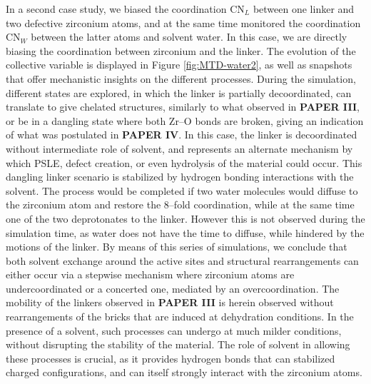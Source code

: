 In a second case study, we biased the coordination CN$_L$ between one linker and two defective zirconium atoms, and at the same time monitored the coordination CN$_W$ between the latter atoms and solvent water. In this case, we are directly biasing the coordination between zirconium and the linker. The evolution of the collective variable is displayed in Figure \ref{fig:MTD-water2}, as well as snapshots that offer mechanistic insights on the different processes. During the simulation, different states are explored, in which the linker is partially decoordinated, can translate to give chelated structures, similarly to what observed in \textbf{PAPER III}, or be in a dangling state where both Zr--O bonds are broken, giving an indication of what was postulated in \textbf{PAPER IV}. In this case, the linker is decoordinated without intermediate role of solvent, and represents an alternate mechanism by which PSLE, defect creation, or even hydrolysis of the material could occur. This dangling linker scenario is stabilized by hydrogen bonding interactions with the solvent. The process would be completed if two water molecules would diffuse to the zirconium atom and restore the 8--fold coordination, while at the same time one of the two deprotonates to the linker. However this is not observed during the simulation time, as water does not have the time to diffuse, while hindered by the motions of the linker.
\npar
By means of this series of simulations, we conclude that both solvent exchange around the active sites and structural rearrangements can either occur via a stepwise mechanism where zirconium atoms are undercoordinated or a concerted one, mediated by an overcoordination. The mobility of the linkers observed in \textbf{PAPER III} is herein observed without rearrangements of the bricks that are induced at dehydration conditions. In the presence of a solvent, such processes can undergo at much milder conditions, without disrupting the stability of the material. The role of solvent in allowing these processes is crucial, as it provides hydrogen bonds that can stabilized charged configurations, and can itself strongly interact with the zirconium atoms.

\clearpage{\pagestyle{empty}\cleardoublepage}